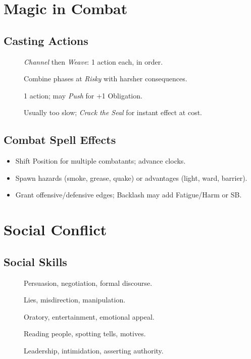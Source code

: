 \section{Magic in Combat}
\label{sec:magic-combat}
\subsection{Casting Actions}
\label{subsec:casting-actions}
\begin{description}
  \item[] \textit{Channel} then \textit{Weave}: 1 action each, in order.
  \item[] Combine phases at \textit{Risky} with harsher consequences.
  \item[] 1 action; may \textit{Push} for +1 Obligation. 
  \item[] Usually too slow; \textit{Crack the Seal} for instant effect at cost.
\end{description}
\subsection{Combat Spell Effects}
\label{subsec:spell-effects}
\begin{itemize}
  \item Shift Position for multiple combatants; advance clocks.
  \item Spawn hazards (smoke, grease, quake) or advantages (light, ward, barrier).
  \item Grant offensive/defensive edges; Backlash may add Fatigue/Harm or SB. 
\end{itemize}

\section{Social Conflict}
\label{sec:social-conflict}
\subsection{Social Skills}
\label{subsec:social-skills}
\begin{description}
  \item[] Persuasion, negotiation, formal discourse.
  \item[] Lies, misdirection, manipulation.
  \item[] Oratory, entertainment, emotional appeal.
  \item[] Reading people, spotting tells, motives.
  \item[] Leadership, intimidation, asserting authority.
\end{description}
